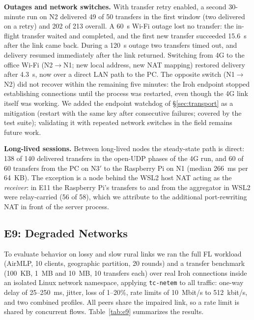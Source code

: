 \documentclass[a4paper,fleqn]{cas-dc}
\begin{document}
\textbf{Outages and network switches.} With transfer retry enabled, a second 30-minute run on N2 delivered 49 of 50 transfers in the first window (two delivered on a retry) and 202 of 213 overall. A 60~s Wi-Fi outage lost no transfer: the in-flight transfer waited and completed, and the first new transfer succeeded 15.6~s after the link came back. During a 120~s outage two transfers timed out, and delivery resumed immediately after the link returned. Switching from 4G to the office Wi-Fi (N2$\to$N1; new local address, new NAT mapping) restored delivery after 4.3~s, now over a direct LAN path to the PC. The opposite switch (N1$\to$N2) did not recover within the remaining five minutes: the Iroh endpoint stopped establishing connections until the process was restarted, even though the 4G link itself was working. We added the endpoint watchdog of \S\ref{sec:transport} as a mitigation (restart with the same key after consecutive failures; covered by the test suite); validating it with repeated network switches in the field remains future work.

\textbf{Long-lived sessions.} Between long-lived nodes the steady-state path is direct: 138 of 140 delivered transfers in the open-UDP phases of the 4G run, and 60 of 60 transfers from the PC on N3$'$ to the Raspberry Pi on N1 (median 266~ms per 64~KB). The exception is a node behind the WSL2 host NAT acting as the \emph{receiver}: in E11 the Raspberry Pi's transfers to and from the aggregator in WSL2 were relay-carried (56 of 58), which we attribute to the additional port-rewriting NAT in front of the server process.

\subsection{E9: Degraded Networks}
\label{sec:e9}

To evaluate behavior on lossy and slow rural links we ran the full FL workload (AirMLP, 10 clients, geographic partition, 20 rounds) and a transfer benchmark (100~KB, 1~MB and 10~MB, 10 transfers each) over real Iroh connections inside an isolated Linux network namespace, applying \texttt{tc-netem} to all traffic: one-way delay of 25--250~ms, jitter, loss of 1--20\%, rate limits of 10~Mbit/s to 512~kbit/s, and two combined profiles. All peers share the impaired link, so a rate limit is shared by concurrent flows. Table~\ref{tab:e9} summarizes the results.
\end{document}
